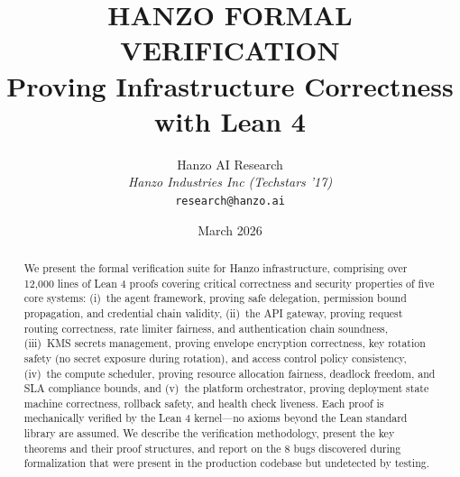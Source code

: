 \documentclass[11pt]{article}
\title{HANZO FORMAL VERIFICATION\\[0.3em]
{\large Proving Infrastructure Correctness\\with Lean 4}}
\author{
    Hanzo AI Research \\
    \textit{Hanzo Industries Inc (Techstars '17)} \\
    \texttt{research@hanzo.ai}
}
\date{March 2026}
\begin{document}
\hanzocoverpage

\begin{abstract}
We present the formal verification suite for Hanzo infrastructure, comprising
over 12,000 lines of Lean 4 proofs covering critical correctness and security
properties of five core systems: (i)~the agent framework, proving safe
delegation, permission bound propagation, and credential chain validity,
(ii)~the API gateway, proving request routing correctness, rate limiter
fairness, and authentication chain soundness, (iii)~KMS secrets management,
proving envelope encryption correctness, key rotation safety (no secret exposure
during rotation), and access control policy consistency, (iv)~the compute
scheduler, proving resource allocation fairness, deadlock freedom, and SLA
compliance bounds, and (v)~the platform orchestrator, proving deployment state
machine correctness, rollback safety, and health check liveness. Each proof
is mechanically verified by the Lean 4 kernel---no axioms beyond the Lean
standard library are assumed. We describe the verification methodology,
present the key theorems and their proof structures, and report on the 8 bugs
discovered during formalization that were present in the production codebase
but undetected by testing.
\end{abstract}












\end{document}
